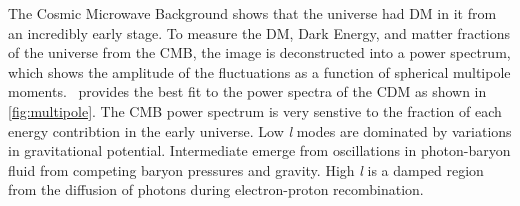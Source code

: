 \begin{figure}[ht]
\end{figure}

The Cosmic Microwave Background shows that the universe had DM in it from an incredibly early stage.
To measure the DM, Dark Energy, and matter fractions of the universe from the CMB, the image is deconstructed into a power spectrum, which shows the amplitude of the fluctuations as a function of spherical multipole moments.
\lcdm~provides the best fit to the power spectra of the CDM as shown in \cref{fig:multipole}.
The CMB power spectrum is very senstive to the fraction of each energy contribtion in the early universe.
Low \textit{l} modes are dominated by variations in gravitational potential.
Intermediate  emerge from oscillations in photon-baryon fluid from competing baryon pressures and gravity.
High \textit{l} is a damped region from the diffusion of photons during electron-proton recombination. \cite{Greene:cosmology_dm}

